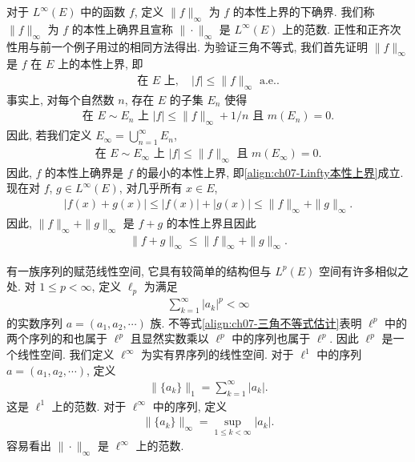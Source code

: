 \documentclass[../../main.tex]{subfiles}
\begin{document}
\begin{example}\label{example:ch07-Linfty范数}
对于 $L^{\infty}(E)$ 中的函数 $f$, 定义 $\|f\|_{\infty}$ 为 $f$ 的本性上界的下确界. 我们称 $\|f\|_{\infty}$ 为 $f$ 的本性上确界且宣称 $\|\cdot\|_{\infty}$ 是 $L^{\infty}(E)$ 上的范数. 正性和正齐次性用与前一个例子用过的相同方法得出. 为验证三角不等式, 我们首先证明 $\|f\|_{\infty}$ 是 $f$ 在 $E$ 上的本性上界, 即
\begin{align}
\text{在 }E\text{ 上},\quad|f|\leqslant\|f\|_{\infty}\text{ a.e.}.\label{align:ch07-Linfty本性上界}
\end{align}
事实上, 对每个自然数 $n$, 存在 $E$ 的子集 $E_{n}$ 使得
\begin{align*}
\text{在 }E\sim E_{n}\text{ 上 }|f|\leqslant\|f\|_{\infty}+1/n\text{ 且 }m(E_{n})=0.
\end{align*}
因此, 若我们定义 $E_{\infty}=\bigcup_{n=1}^{\infty}E_{n}$,
\begin{align*}
\text{在 }E\sim E_{\infty}\text{ 上 }|f|\leqslant\|f\|_{\infty}\text{ 且 }m(E_{\infty})=0.
\end{align*}
因此, $f$ 的本性上确界是 $f$ 的最小的本性上界, 即\eqref{align:ch07-Linfty本性上界}成立. 现在对 $f$, $g\in L^{\infty}(E)$, 对几乎所有 $x\in E$,
\begin{align*}
|f(x)+g(x)|\leqslant|f(x)|+|g(x)|\leqslant\|f\|_{\infty}+\|g\|_{\infty}.
\end{align*}
因此, $\|f\|_{\infty}+\|g\|_{\infty}$ 是 $f+g$ 的本性上界且因此
\begin{align*}
\|f+g\|_{\infty}\leqslant\|f\|_{\infty}+\|g\|_{\infty}.
\end{align*}
\end{example}

\begin{example}\label{example:ch07-lp序列}
有一族序列的赋范线性空间, 它具有较简单的结构但与 $L^{p}(E)$ 空间有许多相似之处. 对 $1\leqslant p<\infty$, 定义 $\ell_{p}$ 为满足
\begin{align*}
\sum_{k=1}^{\infty}|a_{k}|^{p}<\infty
\end{align*}
的实数序列 $a=(a_{1},a_{2},\cdots)$ 族. 不等式\eqref{align:ch07-三角不等式估计}表明 $\ell^{p}$ 中的两个序列的和也属于 $\ell^{p}$ 且显然实数乘以 $\ell^{p}$ 中的序列也属于 $\ell^{p}$. 因此 $\ell^{p}$ 是一个线性空间. 我们定义 $\ell^{\infty}$ 为实有界序列的线性空间. 对于 $\ell^{1}$ 中的序列 $a=(a_{1},a_{2},\cdots)$, 定义
\begin{align*}
\|\{a_{k}\}\|_{1}=\sum_{k=1}^{\infty}|a_{k}|.
\end{align*}
这是 $\ell^{1}$ 上的范数. 对于 $\ell^{\infty}$ 中的序列, 定义
\begin{align*}
\|\{a_{k}\}\|_{\infty}=\sup_{1\leqslant k<\infty}|a_{k}|.
\end{align*}
容易看出 $\|\cdot\|_{\infty}$ 是 $\ell^{\infty}$ 上的范数.
\end{example}
\end{document}

